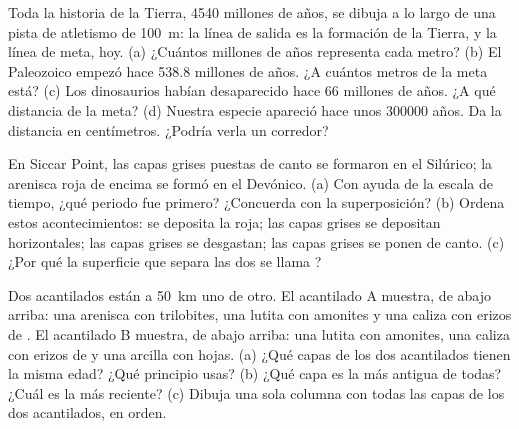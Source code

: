 \begin{exercise}[$\star\star$]\label{exo:g7:geological-time:8}
Toda la historia de la Tierra, \num{4540} millones de años, se dibuja a lo
largo de una pista de atletismo de \qty{100}{m}: la línea de salida es la
formación de la Tierra, y la línea de meta, hoy. (a) ¿Cuántos millones de
años representa cada metro? (b) El Paleozoico empezó hace \num{538.8}
millones de años. ¿A cuántos metros de la meta está? (c) Los dinosaurios
habían desaparecido hace \num{66} millones de años. ¿A qué distancia de la
meta? (d) Nuestra especie apareció hace unos \num{300000} años. Da la
distancia en centímetros. ¿Podría verla un corredor?
\end{exercise}

\begin{exercise}[$\star\star$]\label{exo:g7:geological-time:9}
En Siccar Point, las capas grises puestas de canto se formaron en el
Silúrico; la arenisca roja de encima se formó en el Devónico. (a) Con ayuda
de la escala de tiempo, ¿qué periodo fue primero? ¿Concuerda con la
superposición? (b) Ordena estos acontecimientos: se deposita la 
roja; las capas grises se depositan horizontales; las capas grises se
desgastan; las capas grises se ponen de canto. (c) ¿Por qué la superficie
que separa las dos  se llama ?
\end{exercise}

\begin{exercise}[$\star\star$]\label{exo:g7:geological-time:10}
Dos acantilados están a \qty{50}{km} uno de otro. El acantilado A muestra,
de abajo arriba: una arenisca con trilobites, una lutita con amonites y una
caliza con erizos de . El acantilado B muestra, de abajo arriba: una
lutita con amonites, una caliza con erizos de  y una arcilla con hojas.
(a) ¿Qué capas de los dos acantilados tienen la misma edad? ¿Qué principio
usas? (b) ¿Qué capa es la más antigua de todas? ¿Cuál es la más reciente?
(c) Dibuja una sola columna con todas las capas de los dos acantilados, en
orden.
\end{exercise}

